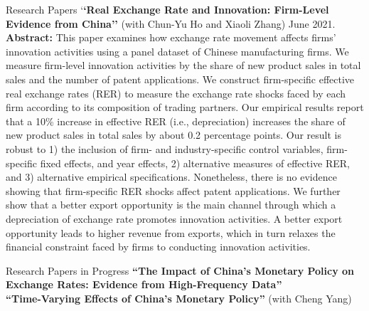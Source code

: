 \documentclass{resume_liang} %
\begin{document}
\begin{rSection}{Research Papers}
`\textbf{`Real Exchange Rate and Innovation: Firm-Level Evidence from China''} (with Chun-Yu Ho and Xiaoli Zhang) June 2021.\vspace{0.1cm}\\
\textbf{Abstract:} This paper examines how exchange rate movement affects firms' innovation activities using a panel dataset of Chinese manufacturing firms. We measure firm-level innovation activities by the share of new product sales in total sales and the number of patent applications. We construct firm-specific effective real exchange rates (RER) to measure the exchange rate shocks faced by each firm according to its composition of trading partners. Our empirical results report that a 10\% increase in effective RER (i.e., depreciation) increases the share of new product sales in total sales by about 0.2 percentage points. Our result is robust to 1) the inclusion of firm- and industry-specific control variables, firm-specific fixed effects, and year effects, 2) alternative measures of effective RER, and 3) alternative empirical specifications. Nonetheless, there is no evidence showing that firm-specific RER shocks affect patent applications. We further show that a better export opportunity is the main channel through which a depreciation of exchange rate promotes innovation activities. A better export opportunity leads to higher revenue from exports, which in turn relaxes the financial constraint faced by firms to conducting innovation activities. \\
\end{rSection}
\bigskip \bigskip




\begin{rSection}{Research Papers in Progress}
	\textbf{``The Impact of China's Monetary Policy on Exchange Rates: Evidence from High-Frequency Data''}\vspace{0.2cm}\\
\textbf{``Time-Varying Effects of China's Monetary Policy''} (with Cheng Yang)\\
\end{rSection}
\bigskip \bigskip 
\end{document}
